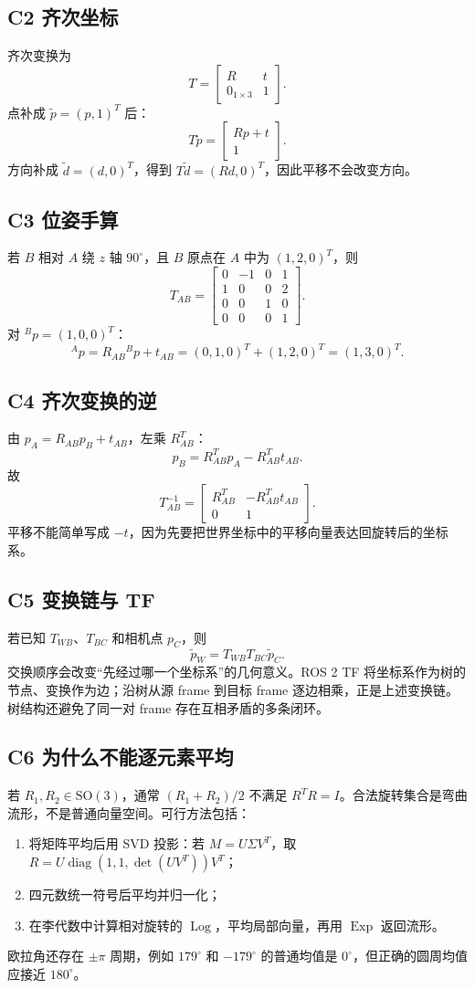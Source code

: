 \documentclass[UTF8,a4paper,11pt]{ctexart}
\newcommand{\SO}{\mathrm{SO}(3)}
\newcommand{\Exp}{\operatorname{Exp}}
\newcommand{\Log}{\operatorname{Log}}
\begin{document}
\subsection{C2 齐次坐标}
齐次变换为
\[
T=\begin{bmatrix}R&t\\0_{1\times3}&1\end{bmatrix}.
\]
点补成 $\tilde p=(p,1)^T$ 后：
\[
T\tilde p=\begin{bmatrix}Rp+t\\1\end{bmatrix}.
\]
方向补成 $\tilde d=(d,0)^T$，得到 $T\tilde d=(Rd,0)^T$，因此平移不会改变方向。

\subsection{C3 位姿手算}
若 $B$ 相对 $A$ 绕 $z$ 轴 $90^\circ$，且 $B$ 原点在 $A$ 中为 $(1,2,0)^T$，则
\[
T_{AB}=\begin{bmatrix}0&-1&0&1\\1&0&0&2\\0&0&1&0\\0&0&0&1\end{bmatrix}.
\]
对 ${}^Bp=(1,0,0)^T$：
\[
{}^Ap=R_{AB}{}^Bp+t_{AB}=(0,1,0)^T+(1,2,0)^T=(1,3,0)^T.
\]

\subsection{C4 齐次变换的逆}
由 $p_A=R_{AB}p_B+t_{AB}$，左乘 $R_{AB}^T$：
\[
p_B=R_{AB}^Tp_A-R_{AB}^Tt_{AB}.
\]
故
\[
T_{AB}^{-1}=\begin{bmatrix}R_{AB}^T&-R_{AB}^Tt_{AB}\\0&1\end{bmatrix}.
\]
平移不能简单写成 $-t$，因为先要把世界坐标中的平移向量表达回旋转后的坐标系。

\subsection{C5 变换链与 TF}
若已知 $T_{WB}$、$T_{BC}$ 和相机点 $p_C$，则
\[
\tilde p_W=T_{WB}T_{BC}\tilde p_C.
\]
交换顺序会改变“先经过哪一个坐标系”的几何意义。ROS 2 TF 将坐标系作为树的节点、变换作为边；沿树从源 frame 到目标 frame 逐边相乘，正是上述变换链。树结构还避免了同一对 frame 存在互相矛盾的多条闭环。

\subsection{C6 为什么不能逐元素平均}
若 $R_1,R_2\in\SO$，通常 $(R_1+R_2)/2$ 不满足 $R^TR=I$。合法旋转集合是弯曲流形，不是普通向量空间。可行方法包括：
\begin{enumerate}
\item 将矩阵平均后用 SVD 投影：若 $M=U\Sigma V^T$，取 $R=U\operatorname{diag}(1,1,\det(UV^T))V^T$；
\item 四元数统一符号后平均并归一化；
\item 在李代数中计算相对旋转的 $\Log$，平均局部向量，再用 $\Exp$ 返回流形。
\end{enumerate}
欧拉角还存在 $\pm\pi$ 周期，例如 $179^\circ$ 和 $-179^\circ$ 的普通均值是 $0^\circ$，但正确的圆周均值应接近 $180^\circ$。
\end{document}

